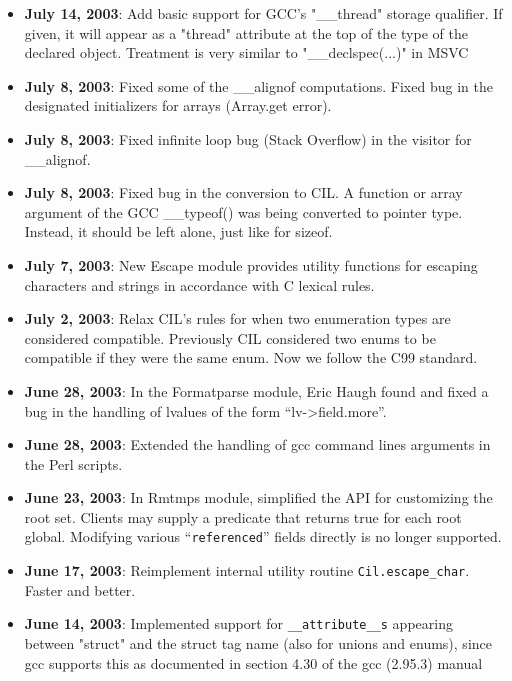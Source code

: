 \documentclass{article}
\def\t#1{{\tt #1}}
\begin{document}
\begin{itemize}
\item {\bf July 14, 2003}: Add basic support for GCC's "\_\_thread" storage
qualifier. If given, it will appear as a "thread" attribute at the top of the
type of the declared object. Treatment is very similar to "\_\_declspec(...)"
in MSVC

\item {\bf July 8, 2003}: Fixed some of the \_\_alignof computations. Fixed
  bug in the designated initializers for arrays (Array.get error).
\item {\bf July 8, 2003}: Fixed infinite loop bug (Stack Overflow) in the
  visitor for \_\_alignof.
\item {\bf July 8, 2003}: Fixed bug in the conversion to CIL. A function or
  array argument of
  the GCC \_\_typeof() was being converted to pointer type. Instead, it should
  be left alone, just like for sizeof.  
\item {\bf July 7, 2003}: New Escape module provides utility functions
  for escaping characters and strings in accordance with C lexical
  rules.

\item {\bf July 2, 2003}: Relax CIL's rules for when two enumeration types are
considered compatible. Previously CIL considered two enums to be compatible if
they were the same enum. Now we follow the C99 standard.


\item {\bf June 28, 2003}: In the Formatparse module, Eric Haugh found and
  fixed a bug in the handling of lvalues of the form ``lv->field.more''.

\item {\bf June 28, 2003}: Extended the handling of gcc command lines
arguments in the Perl scripts. 

\item {\bf June 23, 2003}: In Rmtmps module, simplified the API for
  customizing the root set.  Clients may supply a predicate that
  returns true for each root global.  Modifying various
  ``\texttt{referenced}'' fields directly is no longer supported.

\item {\bf June 17, 2003}: Reimplement internal utility routine
           \t{Cil.escape\_char}. Faster and better. 

\item {\bf June 14, 2003}: Implemented support for \t{\_\_attribute\_\_s}
appearing between "struct" and the struct tag name (also for unions and
enums), since gcc supports this as documented in section 4.30 of the gcc
(2.95.3) manual


\end{itemize}
\end{document}
